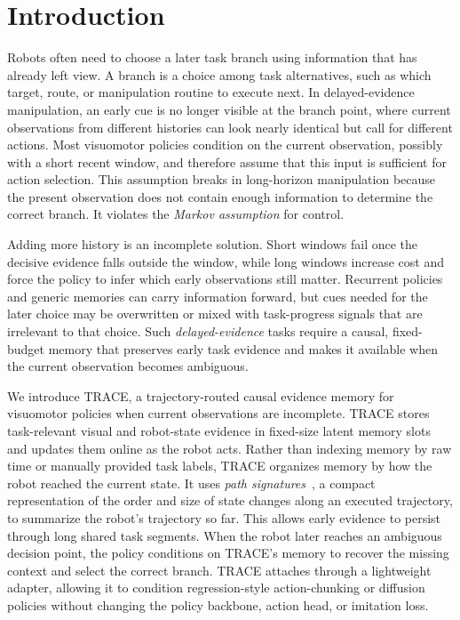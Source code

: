 \documentclass{article}
\begin{document}


\section{Introduction}
Robots often need to choose a later task branch using information that has already left view. A branch is a choice among task alternatives, such as which target, route, or manipulation routine to execute next. In delayed-evidence manipulation, an early cue is no longer visible at the branch point, where current observations from different histories can look nearly identical but call for different actions. Most visuomotor policies condition on the current observation, possibly with a short recent window, and therefore assume that this input is sufficient for action selection. This assumption breaks in long-horizon manipulation because the present observation does not contain enough information to determine the correct branch. It violates the \emph{Markov assumption} for control.

Adding more history is an incomplete solution. Short windows fail once the decisive evidence falls outside the window, while long windows increase cost and force the policy to infer which early observations still matter. Recurrent policies and generic memories can carry information forward, but cues needed for the later choice may be overwritten or mixed with task-progress signals that are irrelevant to that choice. Such \emph{delayed-evidence} tasks require a causal, fixed-budget memory that preserves early task evidence and makes it available when the current observation becomes ambiguous.

We introduce TRACE, a trajectory-routed causal evidence memory for visuomotor policies when current observations are incomplete. TRACE stores task-relevant visual and robot-state evidence in fixed-size latent memory slots and updates them online as the robot acts. Rather than indexing memory by raw time or manually provided task labels, TRACE organizes memory by how the robot reached the current state. It uses \emph{path signatures}~\cite{chevyrev2025primer}, a compact representation of the order and size of state changes along an executed trajectory, to summarize the robot's trajectory so far. This allows early evidence to persist through long shared task segments. When the robot later reaches an ambiguous decision point, the policy conditions on TRACE's memory to recover the missing context and select the correct branch. TRACE attaches through a lightweight adapter, allowing it to condition regression-style action-chunking or diffusion policies without changing the policy backbone, action head, or imitation loss.
\end{document}
